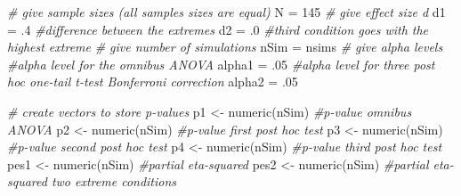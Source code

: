 \documentclass[
]{book}
\newenvironment{Shaded}{\begin{snugshade}}{\end{snugshade}}
\newcommand{\CommentTok}[1]{\textcolor[rgb]{0.56,0.35,0.01}{\textit{#1}}}
\newcommand{\DecValTok}[1]{\textcolor[rgb]{0.00,0.00,0.81}{#1}}
\newcommand{\FunctionTok}[1]{\textcolor[rgb]{0.00,0.00,0.00}{#1}}
\newcommand{\NormalTok}[1]{#1}
\newcommand{\OtherTok}[1]{\textcolor[rgb]{0.56,0.35,0.01}{#1}}
\begin{document}
\begin{Shaded}
\begin{Highlighting}[]
\CommentTok{\# give sample sizes (all samples sizes are equal)}
\NormalTok{N }\OtherTok{=} \DecValTok{145}
\CommentTok{\# give effect size d}
\NormalTok{d1 }\OtherTok{=}\NormalTok{ .}\DecValTok{4} \CommentTok{\#difference between the extremes}
\NormalTok{d2 }\OtherTok{=}\NormalTok{ .}\DecValTok{0} \CommentTok{\#third condition goes with the highest extreme}
\CommentTok{\# give number of simulations}
\NormalTok{nSim }\OtherTok{=}\NormalTok{ nsims}
\CommentTok{\# give alpha levels}
\CommentTok{\#alpha level for the omnibus ANOVA}
\NormalTok{alpha1 }\OtherTok{=}\NormalTok{ .}\DecValTok{05} 
\CommentTok{\#alpha level for three post hoc one{-}tail t{-}test Bonferroni correction}
\NormalTok{alpha2 }\OtherTok{=}\NormalTok{ .}\DecValTok{05} 
\end{Highlighting}
\end{Shaded}

\begin{Shaded}
\begin{Highlighting}[]
\CommentTok{\# create vectors to store p{-}values}
\NormalTok{p1 }\OtherTok{\textless{}{-}} \FunctionTok{numeric}\NormalTok{(nSim) }\CommentTok{\#p{-}value omnibus ANOVA}
\NormalTok{p2 }\OtherTok{\textless{}{-}} \FunctionTok{numeric}\NormalTok{(nSim) }\CommentTok{\#p{-}value first post hoc test}
\NormalTok{p3 }\OtherTok{\textless{}{-}} \FunctionTok{numeric}\NormalTok{(nSim) }\CommentTok{\#p{-}value second post hoc test}
\NormalTok{p4 }\OtherTok{\textless{}{-}} \FunctionTok{numeric}\NormalTok{(nSim) }\CommentTok{\#p{-}value third post hoc test}
\NormalTok{pes1 }\OtherTok{\textless{}{-}} \FunctionTok{numeric}\NormalTok{(nSim) }\CommentTok{\#partial eta{-}squared}
\NormalTok{pes2 }\OtherTok{\textless{}{-}} \FunctionTok{numeric}\NormalTok{(nSim) }\CommentTok{\#partial eta{-}squared two extreme conditions}
\end{Highlighting}
\end{Shaded}
\end{document}
